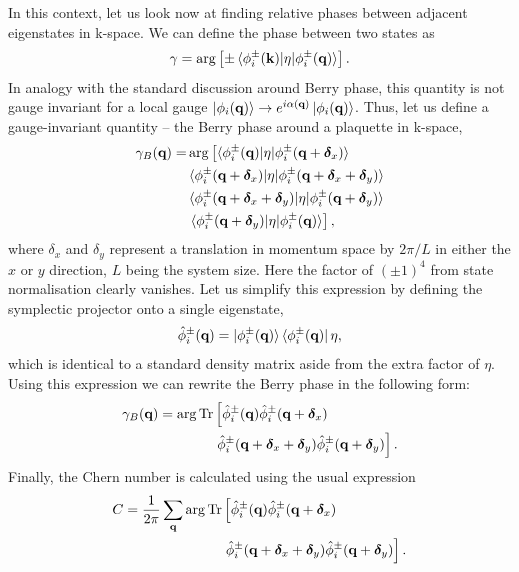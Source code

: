 In this context, let us look now at finding relative phases between adjacent eigenstates in k-space. We can define the phase between two states as
\begin{align}
    \gamma = \arg \left [ \pm 
    \braket{\phi_i^\pm(\textbf k) | \eta  |\phi_i^\pm(\textbf q)}
    \right ].
\end{align}
In analogy with the standard discussion around Berry phase, this quantity is not gauge invariant for a local gauge $\ket{\phi_i(\textbf q)} \rightarrow e^{i\alpha(\textbf q)}\ket{\phi_i(\textbf q)}$. Thus, let us define a gauge-invariant quantity -- the Berry phase around a plaquette in k-space,
\begin{align} 
    \begin{split}
        \gamma_B(\textbf q) = &\arg \left [
        \braket{\phi_i^\pm(\textbf q) | \eta  |\phi_i^\pm(\textbf q + \bm \delta_x)} \right .\\ 
        & \braket{\phi_i^\pm(\textbf q + \bm \delta_x) | \eta  |\phi_i^\pm(\textbf q + \bm \delta_x+ \bm \delta_y)}  \\
        & \braket{\phi_i^\pm(\textbf q + \bm \delta_x+ \bm \delta_y) | \eta  |\phi_i^\pm(\textbf q + \bm \delta_y)}\\
        & \left .\braket{\phi_i^\pm(\textbf q + \bm \delta_y) | \eta  |\phi_i^\pm(\textbf q)} \right ],
    \end{split}
\end{align}
where $\delta_x$ and $\delta_y$ represent a translation in momentum space by $2\pi /L$ in either the $x$ or $y$ direction, $L$ being the system size. Here the factor of $(\pm 1)^4$ from state normalisation clearly vanishes. Let us simplify this expression by defining the symplectic projector onto a single eigenstate,
\begin{align}
    \hat \phi_i^\pm (\textbf q) = \ket{ \phi_i^\pm (\textbf q)}\bra{ \phi_i^\pm (\textbf q)} \eta,
\end{align}
which is identical to a standard density matrix aside from the extra factor of $\eta$. Using this expression we can rewrite the Berry phase in the following form:
\begin{align} 
\begin{split}
    \gamma_{B} (\textbf q) = \arg \textup{Tr} &\left[
    \hat \phi_i^\pm (\textbf q)
    \hat \phi_i^\pm (\textbf q + \bm \delta_x) \right. \\ 
    &\left. \hat \phi_i^\pm (\textbf q+ \bm \delta_x + \bm \delta_y)
    \hat \phi_i^\pm (\textbf q + \bm \delta_y)
    \right]. 
\end{split}
\end{align}
Finally, the Chern number is calculated using the usual expression
\begin{align} 
    \begin{split}
    C  = \frac{1}{2\pi}\sum_{\textbf q} \arg \textup{Tr} & \left[
    \hat \phi_i^\pm (\textbf q)
    \hat \phi_i^\pm (\textbf q + \bm \delta_x) \right. \\ 
    & \left. \hat \phi_i^\pm (\textbf q+ \bm \delta_x + \bm \delta_y)
    \hat \phi_i^\pm (\textbf q + \bm \delta_y)
    \right].
\end{split}
\end{align}


